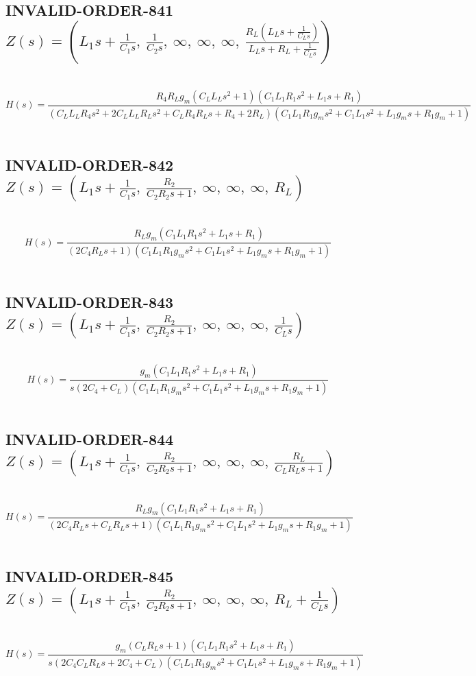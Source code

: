 \documentclass{article}
\begin{document}
\subsection{INVALID-ORDER-841 $Z(s) = \left( L_{1} s + \frac{1}{C_{1} s}, \  \frac{1}{C_{2} s}, \  \infty, \  \infty, \  \infty, \  \frac{R_{L} \left(L_{L} s + \frac{1}{C_{L} s}\right)}{L_{L} s + R_{L} + \frac{1}{C_{L} s}}\right)$ } \ 
\textbf{\[H(s) = \frac{R_{4} R_{L} g_{m} \left(C_{L} L_{L} s^{2} + 1\right) \left(C_{1} L_{1} R_{1} s^{2} + L_{1} s + R_{1}\right)}{\left(C_{L} L_{L} R_{4} s^{2} + 2 C_{L} L_{L} R_{L} s^{2} + C_{L} R_{4} R_{L} s + R_{4} + 2 R_{L}\right) \left(C_{1} L_{1} R_{1} g_{m} s^{2} + C_{1} L_{1} s^{2} + L_{1} g_{m} s + R_{1} g_{m} + 1\right)}\] } \ 
\subsection{INVALID-ORDER-842 $Z(s) = \left( L_{1} s + \frac{1}{C_{1} s}, \  \frac{R_{2}}{C_{2} R_{2} s + 1}, \  \infty, \  \infty, \  \infty, \  R_{L}\right)$ } \ 
\textbf{\[H(s) = \frac{R_{L} g_{m} \left(C_{1} L_{1} R_{1} s^{2} + L_{1} s + R_{1}\right)}{\left(2 C_{4} R_{L} s + 1\right) \left(C_{1} L_{1} R_{1} g_{m} s^{2} + C_{1} L_{1} s^{2} + L_{1} g_{m} s + R_{1} g_{m} + 1\right)}\] } \ 
\subsection{INVALID-ORDER-843 $Z(s) = \left( L_{1} s + \frac{1}{C_{1} s}, \  \frac{R_{2}}{C_{2} R_{2} s + 1}, \  \infty, \  \infty, \  \infty, \  \frac{1}{C_{L} s}\right)$ } \ 
\textbf{\[H(s) = \frac{g_{m} \left(C_{1} L_{1} R_{1} s^{2} + L_{1} s + R_{1}\right)}{s \left(2 C_{4} + C_{L}\right) \left(C_{1} L_{1} R_{1} g_{m} s^{2} + C_{1} L_{1} s^{2} + L_{1} g_{m} s + R_{1} g_{m} + 1\right)}\] } \ 
\subsection{INVALID-ORDER-844 $Z(s) = \left( L_{1} s + \frac{1}{C_{1} s}, \  \frac{R_{2}}{C_{2} R_{2} s + 1}, \  \infty, \  \infty, \  \infty, \  \frac{R_{L}}{C_{L} R_{L} s + 1}\right)$ } \ 
\textbf{\[H(s) = \frac{R_{L} g_{m} \left(C_{1} L_{1} R_{1} s^{2} + L_{1} s + R_{1}\right)}{\left(2 C_{4} R_{L} s + C_{L} R_{L} s + 1\right) \left(C_{1} L_{1} R_{1} g_{m} s^{2} + C_{1} L_{1} s^{2} + L_{1} g_{m} s + R_{1} g_{m} + 1\right)}\] } \ 
\subsection{INVALID-ORDER-845 $Z(s) = \left( L_{1} s + \frac{1}{C_{1} s}, \  \frac{R_{2}}{C_{2} R_{2} s + 1}, \  \infty, \  \infty, \  \infty, \  R_{L} + \frac{1}{C_{L} s}\right)$ } \ 
\textbf{\[H(s) = \frac{g_{m} \left(C_{L} R_{L} s + 1\right) \left(C_{1} L_{1} R_{1} s^{2} + L_{1} s + R_{1}\right)}{s \left(2 C_{4} C_{L} R_{L} s + 2 C_{4} + C_{L}\right) \left(C_{1} L_{1} R_{1} g_{m} s^{2} + C_{1} L_{1} s^{2} + L_{1} g_{m} s + R_{1} g_{m} + 1\right)}\] } \ 
\end{document}
